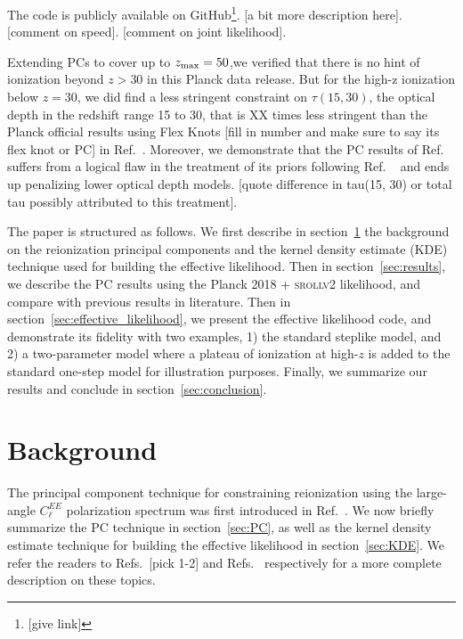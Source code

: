 \documentclass[prd,twocolumn,amsmath,amssymb,floatfix,superscriptaddress,nofootinbib]{revtex4-1}
\begin{document}
The code is publicly available on GitHub\footnote{[give link]}. [a bit more description here]. [comment on speed]. [comment on joint likelihood].

Extending PCs to cover up to $z_{\rm max} = 50$,we verified that there is no hint of ionization beyond $z>30$ in this Planck data release. But for the high-z ionization below $z=30$, we did find a less stringent constraint on $\tau(15, 30)$, the optical depth in the redshift range 15 to 30, that is XX times less stringent than the Planck official results using Flex Knots [fill in number and make sure to say its flex knot or PC] in Ref.~\cite{Aghanim:2018eyx}. Moreover, we demonstrate that the PC results of Ref.~\cite{Aghanim:2018eyx} suffers from a logical flaw in the treatment of its priors following Ref.
~\cite{Millea:2018bko} and ends up penalizing lower optical depth models. [quote difference in tau(15, 30) or total tau possibly attributed to this treatment]. %

The paper is structured as follows. We first describe in section~\ref{sec:background} the background on the reionization principal components and the kernel density estimate (KDE) technique used for building the effective likelihood. Then in section~\ref{sec:results}, we describe the PC results using the Planck 2018 + \textsc{srollv2} likelihood, and compare with previous results in literature. Then in section~\ref{sec:effective_likelihood}, we present the effective likelihood code, and demonstrate its fidelity with two examples, 1) the standard steplike model, and 2) a two-parameter model where a plateau of ionization at high-$z$ is added to the standard one-step model for illustration purposes. Finally, we summarize our results and conclude in section~\ref{sec:conclusion}.



\section{Background}
\label{sec:background}

The principal component technique for constraining reionization using the large-angle $C_\ell^{EE}$ polarization spectrum was first introduced in Ref.~\cite{Hu:2003gh}. We now briefly summarize the PC technique in section~\ref{sec:PC}, as well as the kernel density estimate technique for building the effective likelihood in section~\ref{sec:KDE}. We refer the readers to Refs.~\cite{Hu:2003gh, Mortonson:2008rx, Mortonson:2007hq, Heinrich:2018btc}[pick 1-2] and Refs.~\cite{Heinrich:2016ojb} respectively for a more complete description on these topics.
\end{document}
